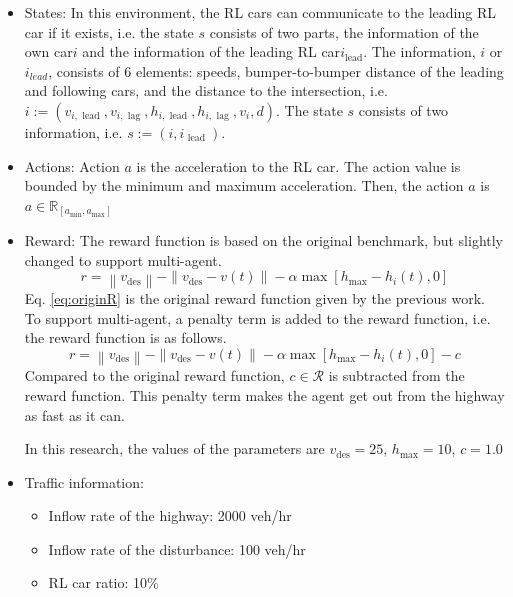 \begin{itemize}
    \item States: In this environment, the RL cars can communicate to the leading RL car if it exists, i.e. the state $s$ consists of two parts, the information of the own car$i$ and the information of the leading RL car$i_{\text {lead}}$. The information, $i$ or $i_{lead}$, consists of 6 elements: speeds, bumper-to-bumper distance of the leading and following cars, and the distance to the intersection, i.e. $i := \left(v_{i, \text { lead }}, v_{i, \text { lag }}, h_{i, \text { lead }}, h_{i, \text { lag }}, v_{i}, d\right)$. The state $s$ consists of two information, i.e. $s := (i, i_{\text { lead }})$.
    \item Actions: Action $a$ is the acceleration to the RL car. The action value is bounded by the minimum and maximum acceleration. Then, the action $a$ is $a \in \mathbb{R}_{[a_{\text {min}}, a_{\text {max}}]}$
    \item Reward: The reward function is based on the original benchmark, but slightly changed to support multi-agent. 
    \begin{equation} \label{eq:originR}
r=\left\|v_{\mathrm{des}}\right\|-\| v_{\mathrm{des}}-v(t) \| -\alpha  \max \left[h_{\max }-h_{i}(t), 0\right]
\end{equation}
    Eq. \ref{eq:originR} is the original reward function given by the previous work\cite{Kreidieh2018}. To support multi-agent, a penalty term is added to the reward function, i.e. the reward function is as follows.
\begin{equation} \label{eq:newR}
r=\left\|v_{\mathrm{des}}\right\|-\| v_{\mathrm{des}}-v(t) \| -\alpha \max \left[h_{\max }-h_{i}(t), 0\right] - c
\end{equation}
    Compared to the original reward function, $c \in \mathcal{R}$ is subtracted from the reward function. This penalty term makes the agent get out from the highway as fast as it can.

    In this research, the values of the parameters are $v_{\mathrm{des}} = 25$, $h_{\max } = 10$, $c = 1.0$

    \item Traffic information:
    \begin{itemize}
        \item Inflow rate of the highway: 2000 veh/hr
        \item Inflow rate of the disturbance: 100 veh/hr
        \item RL car ratio: 10\%
    \end{itemize}
\end{itemize}

